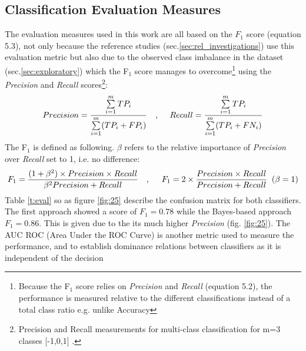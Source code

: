 \documentclass[
	a4paper,
	pdftex,
	12pt,	
	footinclude=true,
	fleqn,
	final,
	]{report}%
\begin{document}
\vspace{-0.3cm}
\subsection*{Classification Evaluation Measures}
\label{sec:eval}
\vspace{-0.3cm}
The evaluation measures used in this work are all based on the $F_{1}$ score 
(equation 5.3), not only because the reference studies 
(sec.\ref{sec:rel_investigations}) use this evaluation 
metric but also due to the observed class imbalance in 
the dataset (sec.\ref{sec:exploratory}) 
which the F$_{1}$ score manages to overcome\footnote{
Because the F$_{1}$ score relies on \emph{Precision} and \emph{Recall} (equation 5.2), 
the performance is measured relative to the different classifications 
instead of a total class ratio e.g. unlike Accuracy} using 
the \emph{Precision} and \emph{Recall} scores\footnote{
Precision and Recall measurements for multi-class classification for m=3 classes [-1,0,1] \cite{Sokolova2009}.}:
\begin{equation}
\begin{align}
Precision = \frac{\sum\limits_{i=1}^{m} TP_{i}}{\sum\limits_{i=1}^{m}(TP_{i} + FP_{i})}  && \text{, \hspace{0.4cm}} Recall = \frac{\sum\limits_{i=1}^{m} TP_{i}}{\sum\limits_{i=1}^{m}(TP_{i} + FN_{i})}
\end{align}
\end{equation}
The F$_{1}$ is defined as following. $\beta$ refers to the relative 
importance of \emph{Precision} over \emph{Recall} set to 1, i.e. no difference:
\begin{equation}
\begin{align}
F_{1} = \frac{(1 + \beta^{2}) \times Precision \times Recall}{\beta^{2} Precision + Recall} &&\text{,\hspace{0.2cm}}&&  F_{1} = 2\times\frac{Precision \times Recall}{Precision + Recall}\hspace{0.2cm}\text{($\beta = 1$)}
\end{align} 
\end{equation}
Table \ref{t:eval} so as figure \ref{fig:25} describe the confusion 
matrix for both classifiers. The first approach showed a score of $F_{1}=0.78$ 
while the Bayes-based approach $F_{1}=0.86$. This is given due to the 
its much higher \emph{Precision} (fig. \ref{fig:25}).
The AUC ROC (Area Under the ROC Curve) is another metric 
used to measure the performance, and to establish dominance 
relations between classifiers as it is independent of the decision
\end{document}
